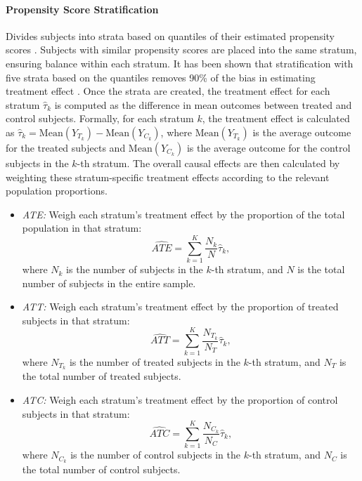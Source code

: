 \documentclass[11pt]{article}
\begin{document}
\paragraph{Propensity Score Stratification} Divides subjects into strata based on quantiles of their estimated propensity scores \citep{williamson2012propensity}. Subjects with similar propensity scores are placed into the same stratum, ensuring balance within each stratum. 
It has been shown that stratiﬁcation with ﬁve strata based on the quantiles removes 90\% of the bias in estimating treatment effect \citep{austin2011introduction, rosenbaum1984reducing}.
Once the strata are created, the treatment effect for each stratum $ \hat{\tau}_k $ is computed as the difference in mean outcomes between treated and control subjects. Formally, for each stratum $ k $, the treatment effect is calculated as $\hat{\tau}_k = \text{Mean}(Y_{T_k}) - \text{Mean}(Y_{C_k})$, where $ \text{Mean}(Y_{T_k}) $ is the average outcome for the treated subjects and $ \text{Mean}(Y_{C_k}) $ is the average outcome for the control subjects in the $ k $-th stratum. The overall causal effects are then calculated by weighting these stratum-specific treatment effects according to the relevant population proportions.

\begin{itemize}
    \item \textit{ATE:} Weigh each stratum's treatment effect by the proportion of the total population in that stratum:
    \[
    \widehat{ATE} = \sum_{k=1}^{K} \frac{N_k}{N} \hat{\tau}_k,
    \]
    where $ N_k $ is the number of subjects in the $ k $-th stratum, and $ N $ is the total number of subjects in the entire sample. 

    \item \textit{ATT:} Weigh each stratum’s treatment effect by the proportion of treated subjects in that stratum:
    \[
    \widehat{ATT} = \sum_{k=1}^{K} \frac{N_{T_k}}{N_T} \hat{\tau}_k,
    \]
    where $ N_{T_k} $ is the number of treated subjects in the $ k $-th stratum, and $ N_T $ is the total number of treated subjects.

    \item \textit{ATC:} Weigh each stratum's treatment effect by the proportion of control subjects in that stratum:
    \[
    \widehat{ATC} = \sum_{k=1}^{K} \frac{N_{C_k}}{N_C} \hat{\tau}_k,
    \]
    where $ N_{C_k} $ is the number of control subjects in the $ k $-th stratum, and $ N_C $ is the total number of control subjects.
\end{itemize}
\end{document}
